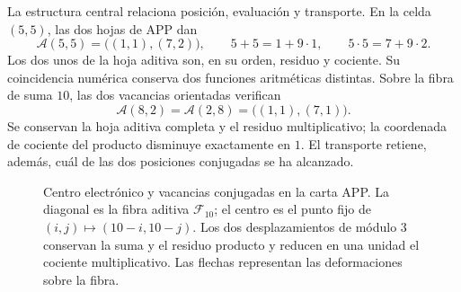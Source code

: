 La estructura central relaciona posición, evaluación y transporte. En la
celda \((5,5)\), las dos hojas de APP dan
\begin{equation}
 \mathcal A(5,5)=\bigl((1,1),(7,2)\bigr),\qquad
 5+5=1+9\cdot1,\qquad5\cdot5=7+9\cdot2.
 \label{x_reciprocidad:el-centro:app}
\end{equation}
Los dos unos de la hoja aditiva son, en su orden, residuo y cociente.
Su coincidencia numérica conserva dos funciones aritméticas distintas.
Sobre la fibra de suma \(10\), las dos vacancias orientadas verifican
\begin{equation}
 \mathcal A(8,2)=\mathcal A(2,8)=\bigl((1,1),(7,1)\bigr).
 \label{x_reciprocidad:el-centro:vacancias}
\end{equation}
Se conservan la hoja aditiva completa y el residuo multiplicativo;
la coordenada de cociente del producto disminuye exactamente en
\(1\). El transporte retiene, además, cuál de las dos posiciones
conjugadas se ha alcanzado.


\begin{figure}[H]
\centering
{}
\caption{Centro electrónico y vacancias conjugadas en la carta APP.
La diagonal es la fibra aditiva \(\mathcal F_{10}\); el centro
es el punto fijo de \((i,j)\mapsto(10-i,10-j)\). Los dos
desplazamientos de módulo \(3\) conservan la suma y el residuo
producto y reducen en una unidad el cociente multiplicativo. Las
flechas representan las deformaciones sobre la fibra.}
\label{x_reciprocidad:el-centro:figura}
\end{figure}

